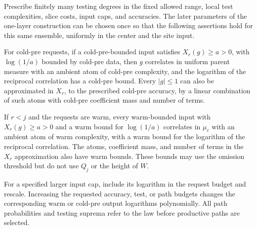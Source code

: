 \begin{theorem}
\label{ap:path:detection}
Prescribe finitely many testing degrees in the fixed allowed range,
local test complexities, slice costs, input caps, and accuracies.
The later parameters of the one-layer construction can be chosen
once so that the following assertions hold for this same ensemble,
uniformly in the center and the site input.

For cold-pre requests, if a cold-pre-bounded input satisfies
$X_r(g)\ge a>0$, with $\log(1/a)$ bounded by cold-pre data,
then $g$ correlates in uniform parent measure with an ambient
atom of cold-pre complexity, and the logarithm of the reciprocal
correlation has a cold-pre bound. Every $|g|\le1$ can also
be approximated in $X_r$, to the prescribed cold-pre accuracy,
by a linear combination of such atoms with cold-pre coefficient
mass and number of terms.

If $r<j$ and the requests are warm, every warm-bounded input
with $X_r(g)\ge a>0$ and a warm bound for $\log(1/a)$
correlates in $\mu_c$ with an ambient atom of warm complexity,
with a warm bound for the logarithm of the reciprocal correlation.
The atoms, coefficient mass, and number of terms in the
$X_r$ approximation also have warm bounds. These
bounds may use the omission threshold but do not use $Q_j$ or
the height of $W$.

For a specified larger input cap, include its logarithm in the
request budget and rescale. Increasing the requested accuracy,
test, or path budgets changes the corresponding warm or cold-pre
output logarithms polynomially. All path probabilities and
testing suprema refer to the law before productive paths are
selected.
\end{theorem}

